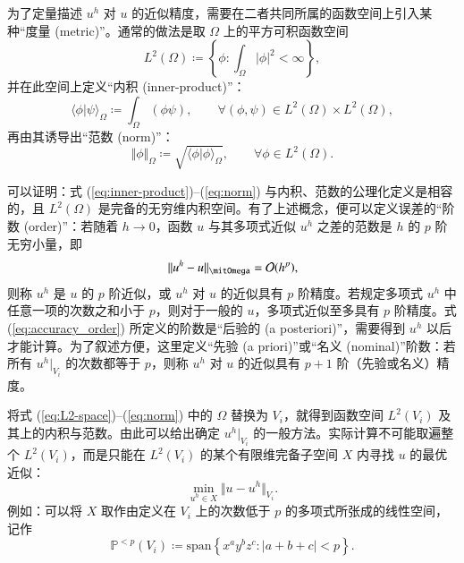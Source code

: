 为了定量描述 $u^{h}$ 对 $u$ 的近似精度，需要在二者共同所属的函数空间上引入某种“度量 (metric)”。通常的做法是取
$\varOmega$ 上的平方可积函数空间
\begin{equation}
L^{2}(\varOmega)\coloneqq\left\{ \phi:\int_{\varOmega}\vert\phi\vert^{2}<\infty\right\} ,\label{eq:L2-space}
\end{equation}
并在此空间上定义“内积 (inner-product)”：
\begin{equation}
\langle\phi\vert\psi\rangle_{\varOmega}\coloneqq\int_{\varOmega}(\phi\psi),\qquad\forall(\phi,\psi)\in L^{2}(\varOmega)\times L^{2}(\varOmega),\label{eq:inner-product}
\end{equation}
再由其诱导出“范数 (norm)”：
\begin{equation}
\Vert\phi\Vert_{\varOmega}\coloneqq\sqrt{\langle\phi\vert\phi\rangle_{\varOmega}},\qquad\forall\phi\in L^{2}(\varOmega).\label{eq:norm}
\end{equation}

\newpage{}

可以证明：式 (\ref{eq:inner-product})–(\ref{eq:norm}) 与内积、范数的公理化定义是相容的，且
$L^{2}(\varOmega)$ 是完备的无穷维内积空间。有了上述概念，便可以定义误差的“阶数 (order)”：若随着 $h\to0$，函数
$u$ 与其多项式近似 $u^{h}$ 之差的范数是 $h$ 的 $p$ 阶无穷小量，即
\begin{equation}
\Vert u^{h}-u\Vert_{\varOmega}=\order{h^{p}},\label{eq:accuracy_order}
\end{equation}
则称 $u^{h}$ 是 $u$ 的 $p$ 阶近似，或 $u^{h}$ 对 $u$ 的近似具有 $p$ 阶精度。若规定多项式
$u^{h}$ 中任意一项的次数之和小于 $p$，则对于一般的 $u$，多项式近似至多具有 $p$ 阶精度。式 (\ref{eq:accuracy_order})
所定义的阶数是“后验的 (a posteriori)”，需要得到 $u^{h}$ 以后才能计算。为了叙述方便，这里定义“先验 (a
priori)”或“名义 (nominal)”阶数：若所有 $u^{h}|_{V_{i}}$ 的次数都等于 $p$，则称 $u^{h}$
对 $u$ 的近似具有 $p+1$ 阶（先验或名义）精度。

将式 (\ref{eq:L2-space})–(\ref{eq:norm}) 中的 $\varOmega$ 替换为 $V_{i}$，就得到函数空间
$L^{2}(V_{i})$ 及其上的内积与范数。由此可以给出确定
$u^{h}|_{V_{i}}$ 的一般方法。实际计算不可能取遍整个 $L^{2}(V_{i})$，而是只能在 $L^{2}(V_{i})$
的某个有限维完备子空间 $X$ 内寻找 $u$ 的最优近似：
\begin{equation}
\min_{u^{h}\in X}\Vert u-u^{h}\Vert_{V_{i}}.
\end{equation}
例如：可以将 $X$ 取作由定义在 $V_{i}$ 上的次数低于 $p$ 的多项式所张成的线性空间，记作
\begin{equation}
\mathbb{P}^{<p}(V_{i})\coloneqq\mathrm{span}\left\{ x^{a}y^{b}z^{c}:\vert a+b+c\vert<p\right\} .
\end{equation}

